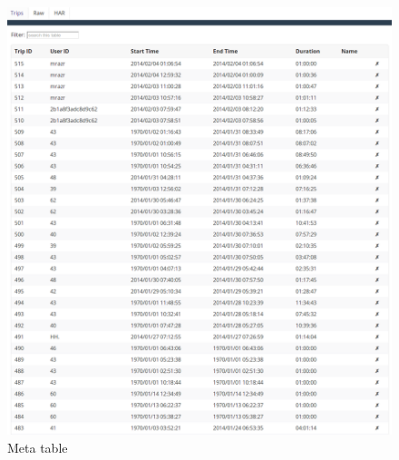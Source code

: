 \begin{figure}[ht]
  \begin{minipage}[b]{0.45\linewidth}
    \includegraphics[width=0.9 \textwidth]{img/sc/inspection_table.png}
    \caption{Meta table}\label{fig:minipage1}
  \end{minipage}\quad
  \begin{minipage}[b]{0.45\linewidth}

\end{minipage}
\end{figure}
